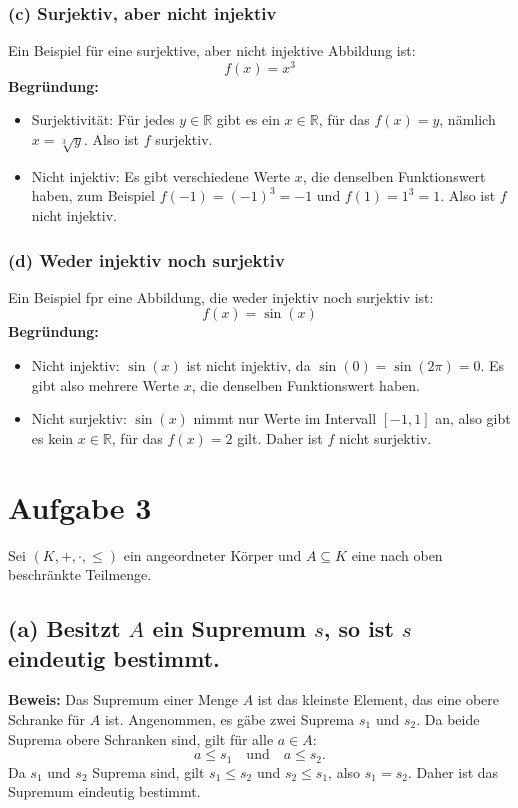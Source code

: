 \documentclass[11pt]{article}
\begin{document}
\subsubsection*{(c) Surjektiv, aber nicht injektiv}

Ein Beispiel für eine surjektive, aber nicht injektive Abbildung ist:
\[
f(x) = x^3
\]
\textbf{Begründung:}
\begin{itemize}
    \item Surjektivität: Für jedes \( y \in \mathbb{R} \) gibt es ein \( x \in \mathbb{R} \), für das \( f(x) = y \), nämlich \( x = \sqrt[3]{y} \). Also ist \( f \) surjektiv.
    \item Nicht injektiv: Es gibt verschiedene Werte \( x \), die denselben Funktionswert haben, zum Beispiel \( f(-1) = (-1)^3 = -1 \) und \( f(1) = 1^3 = 1 \). Also ist \( f \) nicht injektiv.
\end{itemize}

\subsubsection*{(d) Weder injektiv noch surjektiv}

Ein Beispiel fpr eine Abbildung, die weder injektiv noch surjektiv ist:
\[
f(x) = \sin(x)
\]
\textbf{Begründung:}
\begin{itemize}
    \item Nicht injektiv: \( \sin(x) \) ist nicht injektiv, da \( \sin(0) = \sin(2\pi) = 0 \). Es gibt also mehrere Werte \( x \), die denselben Funktionswert haben.
    \item Nicht surjektiv: \( \sin(x) \) nimmt nur Werte im Intervall \( [-1, 1] \) an, also gibt es kein \( x \in \mathbb{R} \), für das \( f(x) = 2 \) gilt. Daher ist \( f \) nicht surjektiv.
\end{itemize}

\section*{Aufgabe 3}

Sei \( (K, +, \cdot, \leq) \) ein angeordneter Körper und \( A \subseteq K \) eine nach oben beschränkte Teilmenge.

\subsection*{(a) Besitzt \( A \) ein Supremum \( s \), so ist \( s \) eindeutig bestimmt.}

\textbf{Beweis:} Das Supremum einer Menge \( A \) ist das kleinste Element, das eine obere Schranke für \( A \) ist. Angenommen, es gäbe zwei Suprema \( s_1 \) und \( s_2 \). Da beide Suprema obere Schranken sind, gilt für alle \( a \in A \):
\[
a \leq s_1 \quad \text{und} \quad a \leq s_2.
\]
Da \( s_1 \) und \( s_2 \) Suprema sind, gilt \( s_1 \leq s_2 \) und \( s_2 \leq s_1 \), also \( s_1 = s_2 \). Daher ist das Supremum eindeutig bestimmt.
\end{document}
